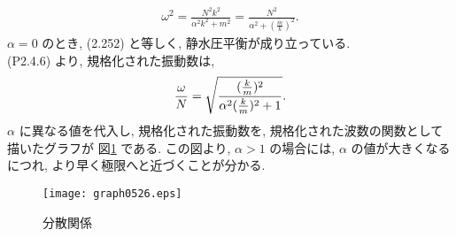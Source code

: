 \documentclass[a4j,12pt,openbib,oneside,dvipdfmx]{jreport}
\def\thefigure{\arabic{chapter}.\arabic{section}.\arabic{figure}}
\begin{document}
\begin{eqnarray}
  {\omega}^2={\frac{N^2k^2}{{\alpha}^2k^2+m^2}}={\frac{N^2}{{\alpha}^2+({\frac{m}{k}})^2}}.
\end{eqnarray}
${\alpha}=0$ のとき, (2.252) と等しく, 静水圧平衡が成り立っている. \\
(P2.4.6) より, 規格化された振動数は, 
\begin{eqnarray}
  \frac{\omega}{N}=\sqrt {\mathstrut {\frac{({\frac{k}{m}})^2}{{\alpha}^2({\frac{k}{m}})^2+1}}}.
\end{eqnarray}
${\alpha}$ に異なる値を代入し, 規格化された振動数を, 規格化された波数の関数として描いたグラフが 図\ref{graph} である. この図より, ${\alpha}>1$ の場合には, ${\alpha}$ の値が大きくなるにつれ, より早く極限へと近づくことが分かる. \\
\def\thefigure{\arabic{figure}}
\begin{figure}[!h]
  \centering
  \texttt{[image: graph0526.eps]}
  \caption{分散関係} \label{graph}
\end{figure}
\end{document}
